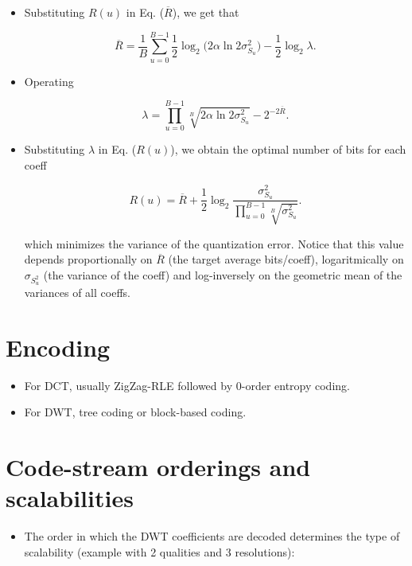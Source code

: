 \begin{itemize}
\item
  Substituting \(R(u)\) in Eq. (\(\overline{R}\)), we get that

  \begin{equation}
    \overline{R} = \frac{1}{B}\sum_{u=0}^{B-1}\frac{1}{2}\log_2\big( 2\alpha\ln 2\sigma_{S_u}^2 \big) - \frac{1}{2}\log_2\lambda.
  \end{equation}
\item
  Operating

  \begin{equation}
    \lambda = \prod_{u=0}^{B-1}\sqrt[B]{2\alpha\ln 2\sigma_{S_u}^2} - 2^{-2\overline{R}}.
  \end{equation}
\item
  Substituting \(\lambda\) in Eq. (\(R(u)\)), we obtain the optimal
  number of bits for each coeff

  \begin{equation}
    R(u) = \overline{R} + \frac{1}{2}\log_2\frac{\sigma_{S_u}^2}{\displaystyle\prod_{u=0}^{B-1}\sqrt[B]{\sigma_{S_u}^2}}.
  \end{equation}

  which minimizes the variance of the quantization error. Notice that
  this value depends proportionally on \(\overline{R}\) (the target
  average bits/coeff), logaritmically on \(\sigma_{S_u^2}\) (the
  variance of the coeff) and log-inversely on the geometric mean of the
  variances of all coeffs.
\end{itemize}

\section{Encoding}
\begin{itemize}
\tightlist
\item
  For DCT, usually ZigZag-RLE followed by 0-order entropy coding.
\item
  For DWT, tree coding or block-based coding.
\end{itemize}

\section{Code-stream orderings and scalabilities}
\begin{itemize}
\tightlist
\item
  The order in which the DWT coefficients are decoded determines the type of
  scalability (example with 2 qualities and 3 resolutions):
\end{itemize}



